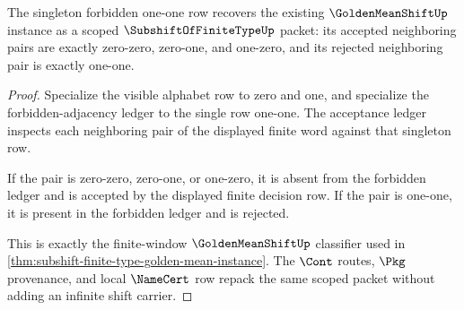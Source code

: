 \begin{theorem}
\label{thm:subshift-finite-type-golden-mean-scope}
The singleton forbidden one-one row recovers the existing $\GoldenMeanShiftUp$ instance as a scoped $\SubshiftOfFiniteTypeUp$ packet: its accepted neighboring pairs are exactly zero-zero, zero-one, and one-zero, and its rejected neighboring pair is exactly one-one.
\end{theorem}
\begin{proof}
Specialize the visible alphabet row to zero and one, and specialize the forbidden-adjacency ledger to the single row one-one. The acceptance ledger inspects each neighboring pair of the displayed finite word against that singleton row.

If the pair is zero-zero, zero-one, or one-zero, it is absent from the forbidden ledger and is accepted by the displayed finite decision row. If the pair is one-one, it is present in the forbidden ledger and is rejected.

This is exactly the finite-window $\GoldenMeanShiftUp$ classifier used in \autoref{thm:subshift-finite-type-golden-mean-instance}. The $\Cont$ routes, $\Pkg$ provenance, and local $\NameCert$ row repack the same scoped packet without adding an infinite shift carrier.
\end{proof}

